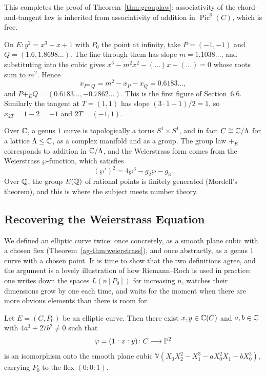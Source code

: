 \documentclass[a4paper]{scrartcl}
\newcommand{\V}{\mathbb{V}}
\DeclareMathOperator{\Pic}{Pic}
\begin{document}
This completes the proof of Theorem~\ref{thm:grouplaw}: associativity of the chord-and-tangent law is inherited from associativity of addition in $\Pic^0(C)$, which is free.

\begin{example}
	On $E \colon y^2 = x^3-x+1$ with $P_0$ the point at infinity, take $P = (-1,-1)$ and $Q = (1.6, 1.8698\ldots)$. The line through them has slope $m = 1.1038\ldots$, and substituting into the cubic gives $x^3 - m^2x^2 - (\ldots)x - (\ldots) = 0$ whose roots sum to $m^2$. Hence
	$$x_{P*Q} = m^2 - x_P - x_Q = 0.6183\ldots,$$
	and $P +_E Q = (0.6183\ldots, -0.7862\ldots)$. This is the first figure of Section~6.6. Similarly the tangent at $T = (1,1)$ has slope $(3\cdot 1 - 1)/2 = 1$, so $x_{2T} = 1 - 2 = -1$ and $2T = (-1,1)$.
\end{example}

\begin{remark}
	Over $\mathbb{C}$, a genus $1$ curve is topologically a torus $S^1\times S^1$, and in fact $C \cong \mathbb{C}/\Lambda$ for a lattice $\Lambda \leq \mathbb{C}$, as a complex manifold and as a group. The group law $+_E$ corresponds to addition in $\mathbb{C}/\Lambda$, and the Weierstrass form comes from the Weierstrass $\wp$-function, which satisfies
	$$(\wp')^2 = 4\wp^3 - g_2\wp - g_3.$$
	Over $\mathbb{Q}$, the group $E(\mathbb{Q})$ of rational points is finitely generated (Mordell's theorem), and this is where the subject meets number theory.
\end{remark}

\subsection{Recovering the Weierstrass Equation}

We defined an elliptic curve twice: once concretely, as a smooth plane cubic with a chosen flex (Theorem~\ref{ag-thm:weierstrass}), and once abstractly, as a genus $1$ curve with a chosen point. It is time to show that the two definitions agree, and the argument is a lovely illustration of how Riemann--Roch is used in practice: one writes down the spaces $L(n[P_0])$ for increasing $n$, watches their dimensions grow by one each time, and waits for the moment when there are more obvious elements than there is room for.

\begin{theorem}\label{thm:g1weier}
	Let $E = (C,P_0)$ be an elliptic curve. Then there exist $x,y \in \mathbb{C}(C)$ and $a,b\in\mathbb{C}$ with $4a^3+27b^2 \neq 0$ such that
	$$\varphi = (1 : x : y) \colon C \longrightarrow \mathbb{P}^2$$
	is an isomorphism onto the smooth plane cubic $\V(X_0X_2^2 - X_1^3 - aX_0^2X_1 - bX_0^3)$, carrying $P_0$ to the flex $(0:0:1)$.
\end{theorem}
\end{document}
